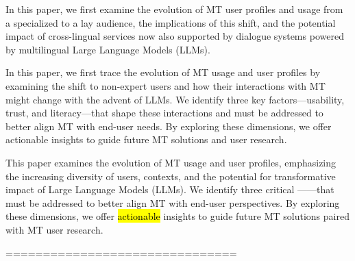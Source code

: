 In this paper, we first examine the evolution of MT user profiles and usage from a specialized to a lay audience, the implications of this shift, and the potential impact of cross-lingual services now also supported by dialogue systems powered by multilingual Large Language Models (LLMs).

In this paper, we first trace the evolution of MT usage and user profiles by examining the shift to non-expert users and how their interactions with MT might change with the advent of LLMs. We identify three key factors—usability, trust, and literacy—that shape these interactions and must be addressed to better align MT with end-user needs. By exploring these dimensions, we offer actionable insights to guide future MT solutions and user research.


This paper examines the evolution of MT usage and user profiles, emphasizing the increasing diversity of users, contexts, and the potential for transformative impact of Large Language Models (LLMs). We identify three critical ---—that must be addressed to better align MT with end-user perspectives. By exploring these dimensions, we offer \hl{actionable} insights to guide future MT solutions paired with MT user research. 








===============================

